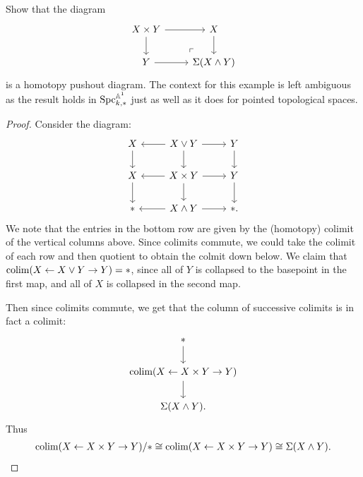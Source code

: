 \documentclass[english]{article}
\providecommand{\smashprod}{\wedge}
\begin{document}
\setcounter{subsection}{5}
\setcounter{theorem}{2}
\begin{exercise} Show that the diagram
\[
	\begin{tikzcd}
	X\times Y\rar\dar & X\dar \\
	Y\rar & \Sigma (X\smashprod Y)\po
	\end{tikzcd}
\]
is a homotopy pushout diagram. The context for this example is left ambiguous as the result holds in $\text{Spc}^{\mathbb{A}^1}_{k,\ast}$ just as well as it does for pointed topological spaces.
\end{exercise}
\begin{proof} Consider the diagram:
\[ \begin{tikzcd}
    X\dar & X\vee Y\lar\rar\dar & Y\dar \\
    X\dar & X\times Y\lar\rar\dar & Y\dar \\
    \ast & X\smashprod Y\lar\rar & \ast.
\end{tikzcd} \]
We note that the entries in the bottom row are given by the (homotopy) colimit of the vertical columns above. Since colimits commute, we could take the colimit of each row and then quotient to obtain the colmit down below. We claim that $\text{colim}(X\leftarrow X\vee Y \to Y) = \ast$, since all of $Y$ is collapsed to the basepoint in the first map, and all of $X$ is collapsed in the second map.

Then since colimits commute, we get that the column of successive colimits is in fact a colimit:
\[ \begin{tikzcd}
    \ast\dar \\
    \colim(X\from X\times Y \to Y)\dar \\
    \Sigma(X\smashprod Y).
\end{tikzcd} \]
Thus
\begin{align*}
    \colim(X\from X\times Y \to Y)/\ast \cong \colim(X\from X\times Y \to Y) \cong \Sigma(X\smashprod Y).
\end{align*}
\end{proof}
\end{document}
